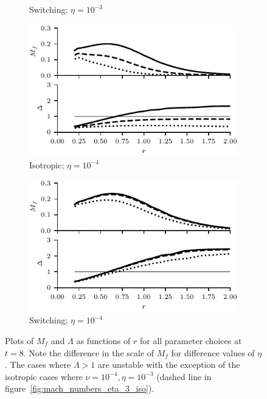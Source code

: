 \begin{figure}[h]
\begin{subfigure}{0.49\textwidth}
      \caption{Switching; $\eta = 10^{-3}$}%
      \label{fig:mach_numbers_eta_3_swi}
    \end{subfigure}
    \hfill
    \begin{subfigure}{0.49\textwidth}
      \centering
  \includegraphics[width=1.0\linewidth]{param_study/mach_numbers_eta_4_iso.pdf}
      \caption{Isotropic; $\eta = 10^{-4}$}%
      \label{fig:mach_numbers_eta_4_iso}
    \end{subfigure}
    \hfill
    \begin{subfigure}{0.49\textwidth}
      \centering
  \includegraphics[width=1.0\linewidth]{param_study/mach_numbers_eta_4_swi.pdf}
      \caption{Switching; $\eta = 10^{-4}$}%
      \label{fig:mach_numbers_eta_4_swi}
    \end{subfigure}

  \caption{Plots of $M_f$ and $\Lambda$ as functions of $r$ for all parameter choices at $t=8$. Note the difference in the scale of $M_f$ for difference values of $\eta$. The cases where $\Lambda > 1$ are unstable with the exception of the isotropic cases where $\nu=10^{-4},\eta=10^{-3}$ (dashed line in figure~\ref{fig:mach_numbers_eta_3_iso}).}%
  \label{fig:mach_numbers}
\end{figure}

